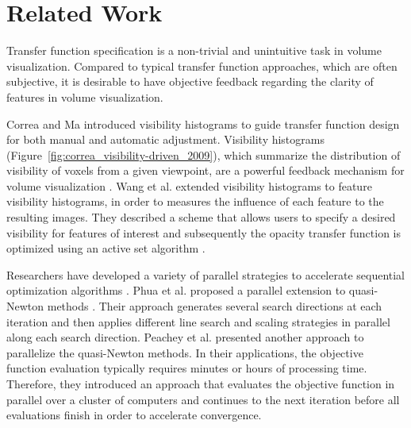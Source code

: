 \section{Related Work}
Transfer function specification is a non-trivial and unintuitive task in volume visualization. Compared to typical transfer function approaches, which are often subjective, it is desirable to have objective feedback regarding the clarity of features in volume visualization.


Correa and Ma \cite{correa_visibility-driven_2009} introduced visibility histograms to guide transfer function design for both manual and automatic adjustment.
Visibility histograms (Figure~\ref{fig:correa_visibility-driven_2009}), which summarize the distribution of visibility of voxels from a given viewpoint, are a powerful feedback mechanism for volume visualization \cite{emsenhuber_visibility_2008}.
Wang et al. \cite{wang_efficient_2011} extended visibility histograms to feature visibility histograms, in order to measures the influence of each feature to the resulting images. They described a scheme that allows users to specify a desired visibility for features of interest and subsequently the opacity transfer function is optimized using an active set algorithm \cite{polyak_conjugate_1969}.


Researchers have developed a variety of parallel strategies to accelerate sequential optimization algorithms \cite{spedicato_algorithms_2012}.
Phua et al. \cite{phua_parallel_1998} proposed a parallel extension to quasi-Newton methods \cite{yang_optimization_2001}. Their approach generates several search directions at each iteration and then applies different line search and scaling strategies in parallel along each search direction.
Peachey et al. \cite{peachey_parallel_2009} presented another approach to parallelize the quasi-Newton methods.
In their applications, the objective function evaluation typically requires minutes or hours of processing time. Therefore, they introduced an approach that evaluates the objective function in parallel over a cluster of computers and continues to the next iteration before all evaluations finish in order to accelerate convergence.

